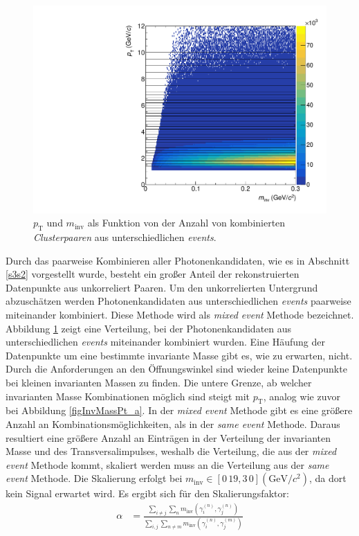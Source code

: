 \begin{figure}[tp]
\centering
\includegraphics[width=.7\linewidth]{hInvMass_pT_Bkg.pdf}
\caption{$p_\text{T}$ und $m_\text{inv}$ als Funktion von der Anzahl von kombinierten  \textit{Clusterpaaren} aus unterschiedlichen \textit{events}.}
\label{figInvMassPt_b}
\end{figure}
Durch das paarweise Kombinieren aller Photonenkandidaten, wie es in Abschnitt \ref{s3s2} vorgestellt wurde, besteht ein großer Anteil der rekonstruierten Datenpunkte aus unkorreliert Paaren.
Um den unkorrelierten Untergrund abzuschätzen werden Photonenkandidaten aus unterschiedlichen \textit{events} paarweise miteinander kombiniert.
Diese Methode wird als \textit{mixed event} Methode bezeichnet.
Abbildung \ref{figInvMassPt_b} zeigt eine Verteilung, bei der Photonenkandidaten aus unterschiedlichen \textit{events} miteinander kombiniert wurden.
Eine Häufung der Datenpunkte um eine bestimmte invariante Masse gibt es, wie zu erwarten, nicht.
Durch die Anforderungen an den Öffnungswinkel sind wieder keine Datenpunkte bei kleinen invarianten Massen zu finden.
Die untere Grenze, ab welcher invarianten Masse Kombinationen möglich sind steigt mit $p_\text{T}$, analog wie zuvor bei Abbildung  \ref{figInvMassPt_a}.
\newline
In der \textit{mixed event} Methode gibt es eine größere Anzahl an Kombinationsmöglichkeiten, als in der \textit{same event} Methode.
Daraus resultiert eine größere Anzahl an Einträgen in der Verteilung der invarianten Masse und des Transversalimpulses, weshalb die Verteilung, die aus der \textit{mixed event} Methode kommt, skaliert werden muss an die Verteilung aus der \textit{same event} Methode.
Die Skalierung erfolgt bei $m_\text{inv} \in \left[0\,19,3\,0\right] (\text{GeV/}c^{2})$, da dort kein Signal erwartet wird.
Es ergibt sich für den Skalierungsfaktor:
\begin{align}
\label{eqBackSkalierung}
\alpha &= \frac{\sum_{i \neq j}\sum_{n}m_{\text{inv}}\left( \gamma^{(n)}_{i},\gamma^{(n)}_{j}\right) }{\sum_{i,j}\sum_{n \neq m}m_{\text{inv}}\left( \gamma^{(n)}_{i},\gamma^{(m)}_{j}\right) }
\end{align}
